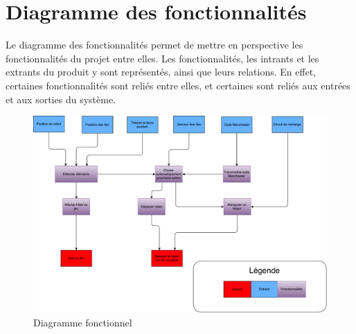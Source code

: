 \chapter{Diagramme des fonctionnalités}

Le diagramme des fonctionnalités permet de mettre en perspective les fonctionnalités du projet entre elles. Les fonctionnalités, les intrants et les extrants du produit y sont représentés, ainsi que leurs relations. En effet, certaines fonctionnalités sont reliés entre elles, et certaines sont reliés aux entrées et aux sorties du système.

\begin{figure}[h]
  \centering
  \includegraphics[scale=0.4]{resources/diag_fonc.pdf}
  \caption{Diagramme fonctionnel}
\end{figure}
